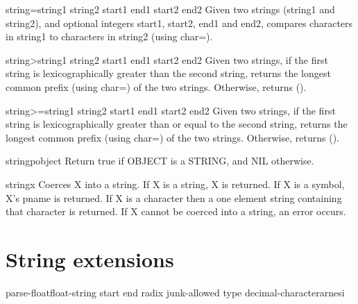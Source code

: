 \begin{function}{string=}{string1 string2 \key start1 end1 start2 end2}{}{}
  Given two strings (string1 and string2), and optional integers start1,
  start2, end1 and end2, compares characters in string1 to characters in
  string2 (using char=).
\end{function}

\begin{function}{string>}{string1 string2 \key start1 end1 start2 end2}{}{}
  Given two strings, if the first string is lexicographically greater than
  the second string, returns the longest common prefix (using char=)
  of the two strings. Otherwise, returns ().
\end{function}

\begin{function}{string>=}{string1 string2 \key start1 end1 start2 end2}{}{}
  Given two strings, if the first string is lexicographically greater
  than or equal to the second string, returns the longest common prefix
  (using char=) of the two strings. Otherwise, returns ().
\end{function}

\begin{function}{stringp}{object}{}{}
  Return true if OBJECT is a STRING, and NIL otherwise.
\end{function}

\begin{class}{string}{x}{}{}
  Coerces X into a string. If X is a string, X is returned. If X is a
   symbol, X's pname is returned. If X is a character then a one element
   string containing that character is returned. If X cannot be coerced
   into a string, an error occurs.
\end{class}

\section{String extensions}
\label{sec:string-extensions}

\begin{function}{parse-float}{float-string \key start end radix junk-allowed type decimal-character}{arnesi}{}
\end{function}
